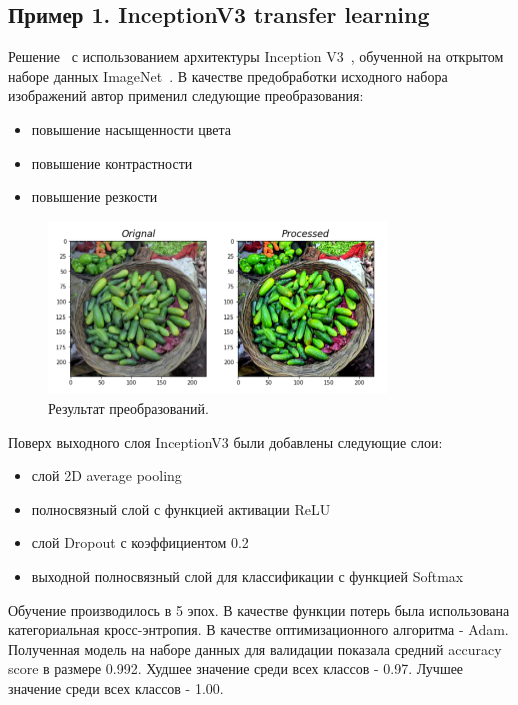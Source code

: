 \documentclass[a4paper,12pt]{extarticle}
\begin{document}
\subsection{Пример 1. InceptionV3 transfer learning}

Решение~\cite{example_1} с использованием архитектуры Inception V3~\cite{inceptionV3}, обученной
на открытом наборе данных ImageNet~\cite{imagenet}. В качестве предобработки исходного набора
изображений автор применил следующие преобразования:

\begin{itemize}
	\item повышение насыщенности цвета
	\item повышение контрастности
	\item повышение резкости
\end{itemize}

\begin{figure}[ht]
	\centering
	\includegraphics[width=0.8\textwidth]{example_1.png}
	\caption{Результат преобразований.}
	\label{fig:example_1}
\end{figure}

Поверх выходного слоя InceptionV3 были добавлены следующие слои:

\begin{itemize}
    \item слой 2D average pooling
    \item полносвязный слой с функцией активации ReLU
    \item слой Dropout с коэффициентом 0.2
    \item выходной полносвязный слой для классификации с функцией Softmax
\end{itemize}

Обучение производилось в 5 эпох. В качестве функции потерь была использована категориальная
кросс-энтропия. В качестве оптимизационного алгоритма - Adam.
Полученная модель на наборе данных для валидации показала средний accuracy score в размере 0.992.
Худшее значение среди всех классов - 0.97. Лучшее значение среди всех классов - 1.00.
\end{document}
